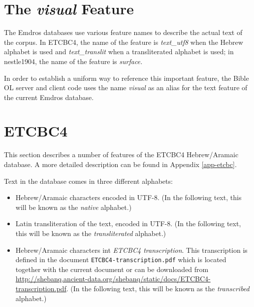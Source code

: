 \documentclass[11pt,oneside,a4paper]{memoir}
\begin{document}
\section{The \emph{visual} Feature}\label{sec-visual}

The Emdros databases use various feature names to describe the actual text of the corpus. In ETCBC4,
the name of the feature is \emph{text\_utf8} when the Hebrew alphabet is used and
\emph{text\_translit} when a transliterated alphabet is used; in nestle1904, the name of the feature
is \emph{surface.}

In order to establish a uniform way to reference this important feature, the Bible OL server and
client code uses the name \emph{visual} as an alias for the text feature of the current Emdros
database.



\section{ETCBC4}

This section describes a number of features of the ETCBC4 Hebrew/Aramaic database. A more detailed
description can be found in Appendix \ref{app-etcbc}.

Text in the database comes in three different alphabets:

\begin{itemize}
\item Hebrew/Aramaic characters encoded in UTF-8. (In the following
  text, this will be known as the \emph{native} alphabet.)
\item Latin transliteration of the text, encoded in UTF-8. (In the
  following text, this will be known as the \emph{transliterated} alphabet.)
\item Hebrew/Aramaic characters int \emph{ETCBC4 transcription}. This transcription is defined in the document
  \texttt{ETCBC4-transcription.pdf} which is located together with the current document or can be
  downloaded from
  \url{http://shebanq.ancient-data.org/shebanq/static/docs/ETCBC4-transcription.pdf}. (In the
  following text, this will be known as the \emph{transcribed} alphabet.)
\end{itemize}
\end{document}
